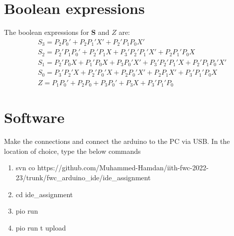 \documentclass[journal,10pt,twocolumn]{article}
\begin{document}
\section*{\large Boolean expressions}
The boolean expressions for \textbf{S} and $Z$ are:
\begin{align*} %
&S_3 = P_2P_0' + P_2P_1'X' + P_2'P_1P_0X'\\
&S_2 = P_2'P_1P_0' + P_2'P_1X + P_3'P_2'P_1'X' + P_2P_1'P_0X\\
&S_1 = P_2'P_0X + P_1'P_0X + P_3P_0'X' + P_3'P_2'P_1'X + P_2'P_1P_0'X'\\
&S_0 = P_3'P_2'X + P_2'P_0'X + P_2P_0'X' + P_2P_1X' + P_3'P_1'P_0X\\
&Z = P_1P_0' + P_2P_0 + P_3P_0' + P_3X + P_3'P_1'P_0
\end{align*}

\section*{\large Software}
Make the connections and connect the arduino to the PC via USB. In the location of choice, type the below commands
\begin{enumerate}
\item svn co https://github.com/Muhammed-Hamdan/iith-fwc-2022-23/trunk/fwc\_arduino\_ide/ide\_assignment
\item cd ide\_assignment
\item pio run
\item pio run \-t upload
\end{enumerate}
\end{document}
